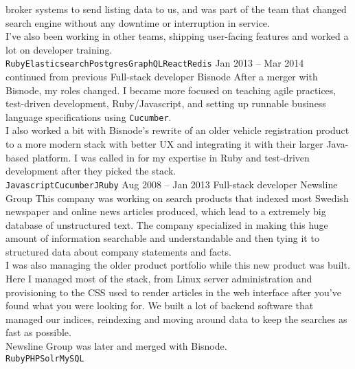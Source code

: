 \documentclass[9pt]{developercv} %
\begin{document}
\begin{entrylist}
{      broker systems to send listing data to us, and was part of the team that
      changed search engine without any downtime or interruption in service.\\
      I've also been working in other teams, shipping user-facing features and
      worked a lot on developer training.\\
      \texttt{Ruby}\slashsep\texttt{Elasticsearch}\slashsep\texttt{Postgres}\slashsep\texttt{GraphQL}\slashsep\texttt{React}\slashsep\texttt{Redis}}
  \entry
    {Jan 2013 -- Mar 2014\\\footnotesize{continued from previous}}
    {Full-stack developer}
    {Bisnode}
    {After a merger with Bisnode, my roles changed. I became more focused on
      teaching agile practices, test-driven development, Ruby/Javascript, and
      setting up runnable business language specifications using
      \texttt{Cucumber}.\\ I also worked a bit with Bisnode's rewrite of an
      older vehicle registration product to a more modern stack with better
      UX and integrating it with their larger Java-based platform. I was called
      in for my expertise in Ruby and test-driven development after they picked
      the stack.\\
      \texttt{Javascript}\slashsep\texttt{Cucumber}\slashsep\texttt{JRuby}}
  \entry
    {Aug 2008 -- Jan 2013}
    {Full-stack developer}
    {Newsline Group}
    {This company was working on search products that indexed most Swedish
      newspaper and online news articles produced, which lead to a extremely
      big database of unstructured text. The company specialized in making this
      huge amount of information searchable and understandable and then tying
      it to structured data about company statements and facts.\\ I was also
      managing the older product portfolio while this new product was built.\\
      Here I managed most of the stack, from Linux server administration and
      provisioning to the CSS used to render articles in the web interface
      after you've found what you were looking for. We built a lot of backend
      software that managed our indices, reindexing and moving around data to
      keep the searches as fast as possible.\\ Newsline Group was later and
      merged with Bisnode.\\
      \texttt{Ruby}\slashsep\texttt{PHP}\slashsep\texttt{Solr}\slashsep\texttt{MySQL}}
\end{entrylist}
\end{document}

